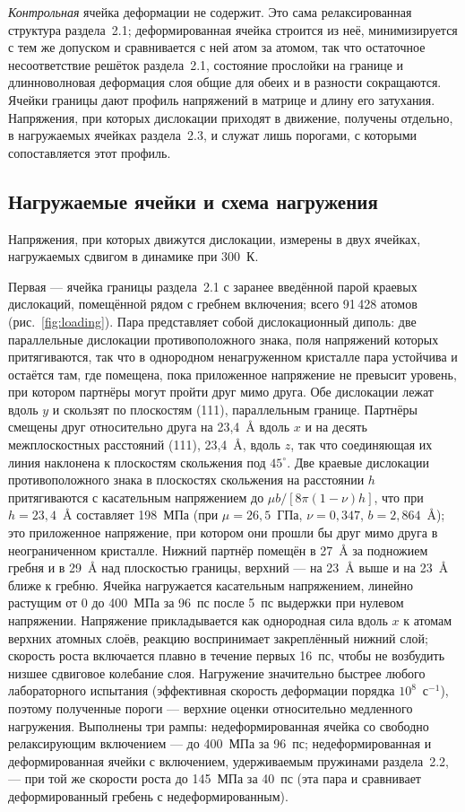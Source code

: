 \emph{Контрольная} ячейка деформации не содержит. Это сама релаксированная
структура раздела~2.1; деформированная ячейка строится из неё,
минимизируется с тем же допуском и сравнивается с ней атом за атомом, так
что остаточное несоответствие решёток раздела~2.1, состояние прослойки на
границе и длинноволновая деформация слоя общие для обеих и в разности
сокращаются. Ячейки границы дают профиль напряжений в матрице и длину его
затухания. Напряжения, при которых дислокации приходят в движение, получены
отдельно, в нагружаемых ячейках раздела~2.3, и служат лишь порогами, с
которыми сопоставляется этот профиль.

\subsection{Нагружаемые ячейки и схема нагружения}

Напряжения, при которых движутся дислокации, измерены в двух ячейках,
нагружаемых сдвигом в динамике при 300~К.

Первая --- ячейка границы раздела~2.1 с заранее введённой парой краевых
дислокаций, помещённой рядом с гребнем включения; всего 91\,428 атомов (рис.~\ref{fig:loading}). Пара представляет собой
дислокационный диполь: две параллельные дислокации противоположного знака,
поля напряжений которых притягиваются, так что в однородном ненагруженном кристалле пара устойчива и остаётся там, где помещена, пока приложенное напряжение не превысит уровень, при котором
партнёры могут пройти друг мимо друга. Обе дислокации лежат вдоль $y$ и
скользят по плоскостям (111), параллельным границе. Партнёры смещены друг относительно друга на 23{,}4~\AA{} вдоль $x$ и на
десять межплоскостных расстояний (111), 23{,}4~\AA{}, вдоль $z$, так что
соединяющая их линия наклонена к плоскостям скольжения под $45^{\circ}$. Две
краевые дислокации противоположного знака в плоскостях скольжения на
расстоянии $h$ притягиваются с касательным напряжением до
$\mu b/[8\pi(1-\nu)h]$, что при $h = 23{,}4$~\AA{} составляет 198~МПа (при
$\mu = 26{,}5$~ГПа, $\nu = 0{,}347$, $b = 2{,}864$~\AA{}); это приложенное
напряжение, при котором они прошли бы друг мимо друга в неограниченном
кристалле. Нижний партнёр помещён в 27~\AA{} за подножием гребня и в
29~\AA{} над плоскостью границы, верхний --- на 23~\AA{} выше и на 23~\AA{}
ближе к гребню. Ячейка нагружается касательным напряжением, линейно растущим от 0
до 400~МПа за 96~пс после 5~пс выдержки при нулевом напряжении. Напряжение
прикладывается как однородная сила вдоль $x$ к атомам верхних атомных слоёв,
реакцию воспринимает закреплённый нижний слой; скорость роста включается
плавно в течение первых 16~пс, чтобы не возбудить низшее сдвиговое колебание
слоя. Нагружение значительно быстрее любого лабораторного испытания
(эффективная скорость деформации порядка $10^{8}$~с$^{-1}$), поэтому
полученные пороги --- верхние оценки относительно медленного нагружения.
Выполнены три рампы: недеформированная ячейка со свободно релаксирующим
включением --- до 400~МПа за 96~пс; недеформированная и деформированная
ячейки с включением, удерживаемым пружинами раздела~2.2, --- при той же
скорости роста до 145~МПа за 40~пс (эта пара и сравнивает деформированный
гребень с недеформированным).

